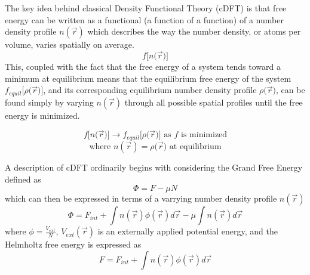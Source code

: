 \documentclass[12pt]{article}
\begin{document}
The key idea behind classical Density Functional Theory (cDFT) is that free energy can be written as a functional (a function of a function) of a number density profile $n(\vec{r})$ which describes the way the number density, or atoms per volume, varies spatially on average. 
\begin{displaymath}{f[n(}\vec{r}{)]}\end{displaymath}
This, coupled with the fact that the free energy of a system tends toward a minimum at equilibrium means that the equilibrium free energy of the system ${f_{equil}}{[}\rho{(}\vec{r}{)]}$, and its corresponding equilibrium number density profile $\rho{(}\vec{r}{)}$, can be found simply by varying $n(\vec{r})$ through all possible spatial profiles until the free energy is minimized. 

\begin{displaymath}{f[n(}\vec{r}{)]}\rightarrow{f_{equil}}{[}\rho{(}\vec{r}{)]}  \mbox{ as $f$ is minimized} \end{displaymath}
\begin{displaymath}{\mbox{where }  n(\vec{r})=\rho{(}\vec{r})  \mbox{ at equilibrium}}\end{displaymath}


A description of cDFT ordinarily begins with considering the Grand Free Energy defined as
\begin{equation}\Phi=F-\mu{N}\end{equation}
which can then be expressed in terms of a varrying number density profile $n(\vec r)$
\begin{equation}\label{GrandFE}\Phi= F_{int} +\int n(\vec{r})\phi{(\vec r)}d\vec{r}-\mu\int n(\vec r)d\vec{r}\end{equation}
where $\phi=\frac{V_{ext}}{N}$, $V_{ext}(\vec r)$ is an externally applied potential energy, and the Helmholtz free energy is expressed as
\begin{equation}F = F_{int} + \int n(\vec{r})\phi{(\vec r)}d\vec{r}\end{equation}  
\end{document}
